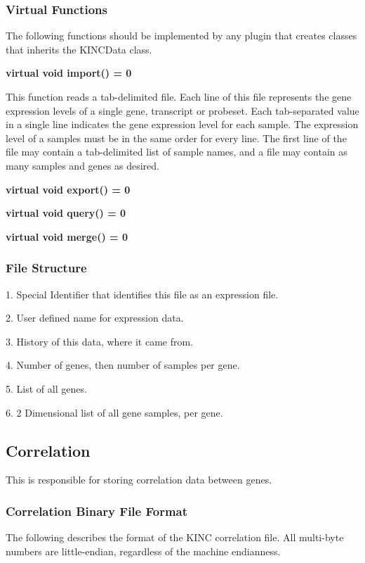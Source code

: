 \documentclass[10pt]{article}
\begin{document}
\subsubsection{Virtual Functions}

The following functions should be implemented by any plugin that creates
classes that inherits the KINCData class.

{\bfseries virtual void import() = 0}

This function reads a tab-delimited file.  Each line of this file
represents the gene expression levels of a single gene, transcript or probeset.
Each tab-separated value in a single line indicates the gene expression level 
for each sample. The expression level of a samples must be in the same 
order for every line.  The first line of the file may contain a tab-delimited
list of sample names, and a file may contain as many samples and genes as
desired.

{\bfseries virtual void export() = 0}

{\bfseries virtual void query() = 0}

{\bfseries virtual void merge() = 0}


\subsubsection{File Structure}

\begin{list}{}{}
\item[1.] Special Identifier that identifies this file as an expression file.
\item[2.] User defined name for expression data.
\item[3.] History of this data, where it came from.
\item[4.] Number of genes, then number of samples per gene.
\item[5.] List of all genes.
\item[6.] 2 Dimensional list of all gene samples, per gene.
\end{list}

\subsection{Correlation}

This is responsible for storing correlation data between genes.

\subsubsection{Correlation Binary File Format}
The following describes the format of the KINC correlation file. All 
multi-byte numbers are little-endian, regardless of the machine endianness.
\end{document}
